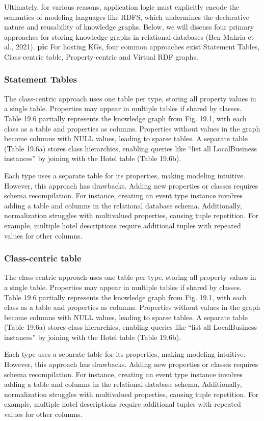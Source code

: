 \documentclass[12pt]{article}
\begin{document}
Ultimately, for various reasons, application logic must explicitly encode the semantics of modeling languages like RDFS, which undermines the declarative nature and reusability of knowledge graphs. Below, we will discuss four primary approaches for storing knowledge graphs in relational databases (Ben Mahria et al., 2021).
\textbf{pic}
For hosting KGs, four common approaches exist Statement Tables, Class-centric table, Property-centric and Virtual RDF graphs.
\subsubsection{Statement Tables}
The class-centric approach uses one table per type, storing all property values in a single table. Properties may appear in multiple tables if shared by classes. Table 19.6 partially represents the knowledge graph from Fig. 19.1, with each class as a table and properties as columns. Properties without values in the graph become columns with NULL values, leading to sparse tables. A separate table (Table 19.6a) stores class hierarchies, enabling queries like “list all LocalBusiness instances” by joining with the Hotel table (Table 19.6b).

Each type uses a separate table for its properties, making modeling intuitive. However, this approach has drawbacks. Adding new properties or classes requires schema recompilation. For instance, creating an event type instance involves adding a table and columns in the relational database schema. Additionally, normalization struggles with multivalued properties, causing tuple repetition. For example, multiple hotel descriptions require additional tuples with repeated values for other columns.
\subsubsection{Class-centric table}
The class-centric approach uses one table per type, storing all property values in a single table. Properties may appear in multiple tables if shared by classes. Table 19.6 partially represents the knowledge graph from Fig. 19.1, with each class as a table and properties as columns. Properties without values in the graph become columns with NULL values, leading to sparse tables. A separate table (Table 19.6a) stores class hierarchies, enabling queries like “list all LocalBusiness instances” by joining with the Hotel table (Table 19.6b).

Each type uses a separate table for its properties, making modeling intuitive. However, this approach has drawbacks. Adding new properties or classes requires schema recompilation. For instance, creating an event type instance involves adding a table and columns in the relational database schema. Additionally, normalization struggles with multivalued properties, causing tuple repetition. For example, multiple hotel descriptions require additional tuples with repeated values for other columns.
\end{document}
